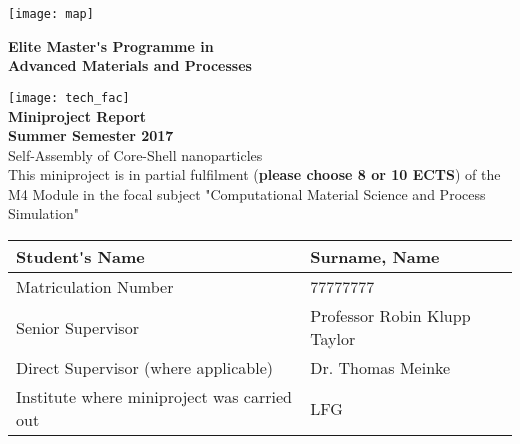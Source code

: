 \begin{titlepage}



\noindent%
\texttt{[image: map]}%
\begin{minipage}[b]{0.5\textwidth}
\centering
\textbf{Elite Master\'{}s Programme in} \\
\textbf{Advanced Materials and Processes}
\end{minipage}%
\texttt{[image: tech\_fac]}
\\[4mm]
\centering
\textbf{Miniproject Report}
\\[2mm]
\textbf{Summer Semester 2017}
\\[4mm]
\LARGE{Self-Assembly of Core-Shell nanoparticles}
\\[6mm]
\Large{This miniproject is in partial fulfilment (\textbf{please choose 8 or  
10
ECTS}) of the M4 Module in the focal 
subject "Computational Material Science and Process Simulation"}   
\\[4mm]
\begin{centering}
\begin{tabularx}{\textwidth}{|Z|Y|}
\hline
  {\normalsize Student\'{}s Name} & 
  {\large Surname, Name}
\\
\hline
  {\normalsize Matriculation Number} &
  {\large 77777777}
\\
\hline
  {\normalsize Senior Supervisor} & 
  {\large Professor Robin Klupp Taylor}
\\
\hline
 {\normalsize Direct Supervisor (where
applicable)} & 
  {\large Dr. Thomas Meinke}
\\
\hline
{\normalsize Institute where miniproject
was carried out} &
  {\large LFG}
\\
\hline
\end{tabularx}
\end{centering}




\end{titlepage}
